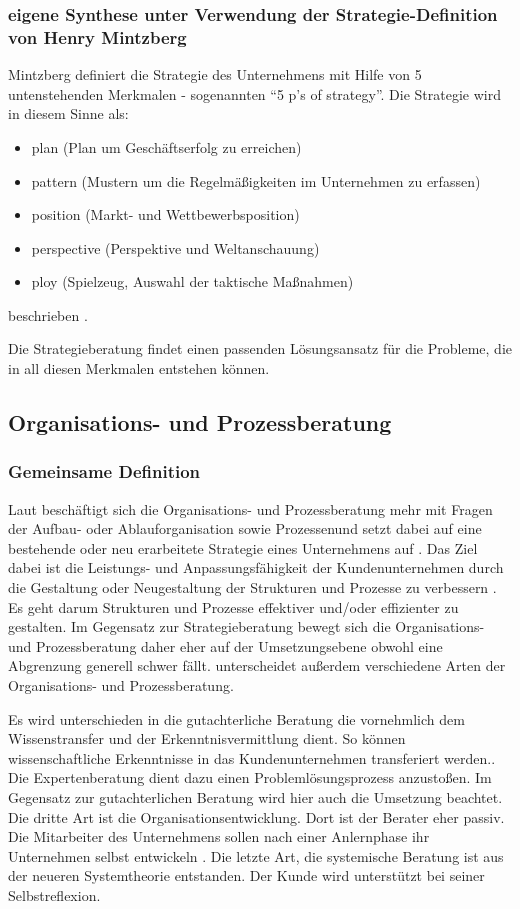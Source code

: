 \subsubsection{eigene Synthese unter Verwendung der Strategie-Definition von Henry Mintzberg} 
Mintzberg definiert die Strategie des Unternehmens mit Hilfe von 5 untenstehenden Merkmalen - sogenannten “5 p’s of strategy”.
Die Strategie wird in diesem Sinne als: 
\begin{itemize}

\item plan (Plan um Geschäftserfolg zu erreichen)
\item pattern (Mustern um die Regelmäßigkeiten im Unternehmen zu erfassen)
\item position (Markt- und Wettbewerbsposition)
\item perspective (Perspektive und Weltanschauung)
\item ploy (Spielzeug, Auswahl der taktische Maßnahmen) 
\end{itemize}
beschrieben \cite{5Ps}.

Die Strategieberatung findet einen passenden Lösungsansatz für die Probleme, die in all diesen Merkmalen  entstehen können.


\subsection{Organisations- und Prozessberatung}

\subsubsection*{Gemeinsame Definition}
Laut \cite[63]{Lippold201309} beschäftigt sich die Organisations- und Prozessberatung mehr \glqq mit Fragen der Aufbau- oder Ablauforganisation sowie Prozessen\grqq und setzt dabei auf eine \glqq bestehende oder neu erarbeitete Strategie eines Unternehmens auf \grqq. Das Ziel \glqq dabei ist die Leistungs- und Anpassungsfähigkeit der Kundenunternehmen durch die Gestaltung oder Neugestaltung der Strukturen und Prozesse zu verbessern \grqq. Es geht darum Strukturen und Prozesse \glqq effektiver und/oder effizienter \grqq zu gestalten. Im Gegensatz zur Strategieberatung bewegt sich die Organisations- und Prozessberatung daher eher auf der Umsetzungsebene obwohl eine Abgrenzung generell schwer fällt. \cite[63]{Lippold201309} unterscheidet außerdem verschiedene Arten der Organisations- und Prozessberatung.

Es wird unterschieden in die gutachterliche Beratung die \glqq vornehmlich dem Wissenstransfer und der Erkenntnisvermittlung \grqq dient. So können \glqq wissenschaftliche Erkenntnisse in das Kundenunternehmen transferiert werden.\grqq . Die Expertenberatung dient dazu einen \glqq Problemlösungsprozess \grqq anzustoßen. Im Gegensatz zur gutachterlichen Beratung wird hier auch die Umsetzung beachtet. Die dritte Art ist die Organisationsentwicklung. Dort ist der Berater \glqq eher passiv\grqq. 
Die Mitarbeiter des Unternehmens sollen nach einer Anlernphase ihr Unternehmen selbst \glqq entwickeln \grqq . 
Die letzte Art, die systemische Beratung ist aus der neueren Systemtheorie entstanden. Der Kunde wird unterstützt \glqq bei seiner Selbstreflexion\grqq. 

